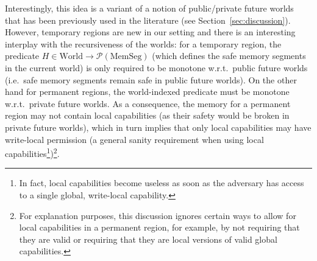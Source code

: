 \documentclass[format=acmsmall, review=true, screen=true]{acmart}
\renewcommand{\sectionname}{Section}
\newcommand{\powerset}[1]{\mathcal{P}(#1)}
\newcommand{\plaindom}[1]{\mathrm{#1}}
\newcommand{\HeapSegments}{\plaindom{MemSeg}}
\newcommand{\MemSegments}{\HeapSegments}
\newcommand{\Worlds}{\plaindom{World}}
\newenvironment{toplas}%
    {\color{OliveGreen}}{}
\begin{document}
\begin{toplas}
Interestingly, this idea is a variant of a notion of public/private future worlds that has been previously used in the literature (see \sectionname~\ref{sec:discussion}).
However, temporary regions are new in our setting and there is an interesting interplay with the recursiveness of the worlds: for a temporary region, the predicate $H \in \Worlds \rightarrow \powerset{\MemSegments}$ (which defines the safe memory segments in the current world) is only required to be monotone w.r.t.\ public future worlds (i.e.\ safe memory segments remain safe in public future worlds).
On the other hand for permanent regions, the world-indexed predicate must be monotone w.r.t.\ private future worlds.
As a consequence, the memory for a permanent region may not contain local capabilities (as their safety would be broken in private future worlds), which in turn implies that only local capabilities may have write-local permission (a general sanity requirement when using local capabilities\footnote{In fact, local capabilities become useless as soon as the adversary has access to a single global, write-local capability.})\footnote{For explanation purposes, this discussion ignores certain ways to allow for local capabilities in a permanent region, for example, by not requiring that they are valid or requiring that they are local versions of valid global capabilities.}.
\end{toplas}
\end{document}
